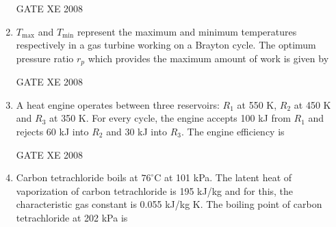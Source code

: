 \documentclass[12pt]{article}
\begin{document}
\begin{enumerate}
 GATE XE 2008  

\item $T_{\max}$ and $T_{\min}$ represent the maximum and minimum temperatures respectively in a gas turbine working on a Brayton cycle. The optimum pressure ratio $r_p$ which provides the maximum amount of work is given by  

\begin{enumerate}
\end{enumerate}


 GATE XE 2008  

\item A heat engine operates between three reservoirs: $R_1$ at 550 K, $R_2$ at 450 K and $R_3$ at 350 K. For every cycle, the engine accepts 100 kJ from $R_1$ and rejects 60 kJ into $R_2$ and 30 kJ into $R_3$. The engine efficiency is  

\begin{enumerate}
 \end{enumerate}

 GATE XE 2008  

\item Carbon tetrachloride boils at $76^{\circ}$C at 101 kPa. The latent heat of vaporization of carbon tetrachloride is 195 kJ/kg and for this, the characteristic gas constant is 0.055 kJ/kg K. The boiling point of carbon tetrachloride at 202 kPa is 

\begin{enumerate}
 \end{enumerate}


\end{enumerate}
\end{document}
